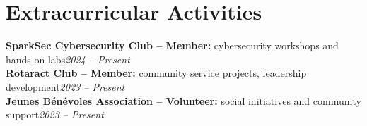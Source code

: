 \documentclass[10pt,a4paper]{article}
\begin{document}
\section{Extracurricular Activities}
\textbf{SparkSec Cybersecurity Club -- Member:} cybersecurity workshops and hands-on labs\hfill\textit{\small 2024 -- Present}\\
\textbf{Rotaract Club -- Member:} community service projects, leadership development\hfill\textit{\small 2023 -- Present}\\
\textbf{Jeunes Bénévoles Association -- Volunteer:} social initiatives and community support\hfill\textit{\small 2023 -- Present}
\end{document}
